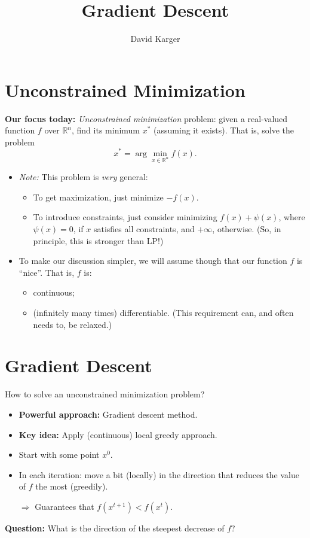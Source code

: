 \documentclass{article}
\title{Gradient Descent}
\author{David Karger}
\newcommand{\RR}{\mathbb{R}}
\begin{document}
\section{Unconstrained Minimization}
{\bf Our focus today:} {\em Unconstrained minimization} problem: given a real-valued function $f$ over $\RR^n$, find its minimum $x^*$ (assuming it exists). That is, solve the problem
\[
x^*=\arg\min_{x\in \RR^n} f(x).
\]
\begin{itemize}
\item {\em Note:} This problem is {\em very} general:
\begin{itemize}
\item To get maximization, just minimize $-f(x)$. 
\item To introduce constraints, just consider minimizing $f(x)+\psi(x)$, where $\psi(x)=0$, if $x$ satisfies all constraints, and $+\infty$, otherwise. (So, in principle, this is stronger than LP!)
\end{itemize}
\item To make our discussion simpler, we will assume though that our function $f$ is ``nice''. That is, $f$ is:
\begin{itemize}
\item continuous;
\item (infinitely many times) differentiable. (This requirement can, and often needs to, be relaxed.)
\end{itemize}
\end{itemize}

\section{Gradient Descent}

How to solve an unconstrained minimization problem?
\begin{itemize}
\item {\bf Powerful approach:} Gradient descent method.
\item {\bf Key idea:} Apply (continuous) local greedy approach. 
\item Start with some point $x^0$.
\item In each iteration: move a bit (locally) in the direction that reduces the value of $f$ the most (greedily).

$\Rightarrow$ Guarantees that $f(x^{t+1})<f(x^t)$.
\end{itemize}

{\bf Question:} What is the direction of the steepest decrease of $f$?
\end{document}
